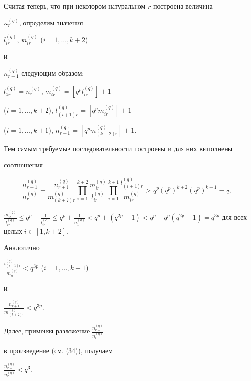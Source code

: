 Считая теперь, что при некотором натуральном $r$ построена величина 


$n_r^{(q)}$, определим значения


$l_{ir}^{(q)}$, $m_{ir}^{(q)}$ ($i=1,\dotsc,k+2$)


и


$n_{r+1}^{(q)}$ следующим образом:


$l_{1r}^{(q)}=n_r^{(q)}$, $m_{ir}^{(q)}=[q^p l_{ir}^{(q)}]+1$ 


($i=1,\dotsc, k+2$), $l_{(i+1)r}^{(q)}=[q^p m_{ir}^{(q)}]+1$ 


($i=1, \dotsc, k+1$), $n_{r+1}^{(q)}=[q^p m_{(k+2)r}^{(q)}]+1$.





Тем самым требуемые последовательности построены и для них выполнены 


соотношения


\begin{equation}


\frac{n_{r+1}^{(q)}}{n_{r}^{(q)}}=


\frac{n_{r+1}^{(q)}}{m_{(k+2)r}^{(q)}} 


\prod_{i=1}^{k+2} \frac{m_{ir}^{(q)}}{l_{ir}^{(q)}} 


\prod_{i=1}^{k+1} \frac{l_{(i+1)r}^{(q)}}{m_{ir}^{(q)}}>


q^p (q^p)^{k+2} (q^p)^{k+1}=q,


\end{equation}


$\frac{m_{ir}^{(q)}}{l_{ir}^{(q)}} \le q^p+\frac{1}{l_{ir}^{(q)}} \le 


q^p+\frac{1}{n_{1}^{(q)}}<q^p+(q^{2p}-1)<


q^p+q^p (q^{2p} -1)=q^{3p}$ для всех целых $i\in [1, k+2]$.





Аналогично 


$\frac{l_{(i+1)r}^{(q)}}{m_{ir}^{(q)}}<q^{3p}$ ($i=1, \dotsc, k+1$)


и


$\frac{n_{r+1}^{(q)}}{m_{(k+2)r}^{(q)}}<q^{3p}$.





Далее, применяя разложение $\frac{n_{r+1}^{(q)}}{n_{r}^{(q)}}$ 


в произведение (см. (34)), получаем


$\frac{n_{r+1}^{(q)}}{n_{r}^{(q)}}<q^3$. 


